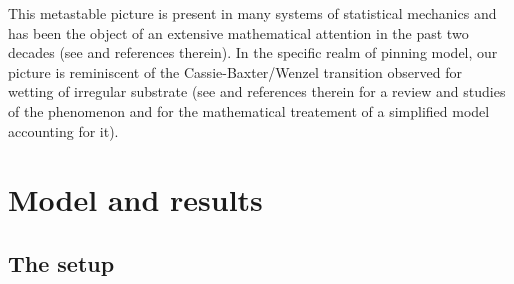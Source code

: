 \documentclass[reqno,11pt]{amsart}
\numberwithin{equation}{section}
\begin{document}
\medskip

This metastable picture is present in many systems of statistical mechanics and has been the object of an extensive mathematical attention in the past two decades (see  \cite{beltran2015martingale, bovier2016metastability} and references therein).
In the specific realm of pinning model, our picture is reminiscent of the Cassie-Baxter/Wenzel transition observed for wetting of irregular substrate (see \cite{giacomello2012} and references therein for a review and studies of the phenomenon and \cite{de2011metastable, lacoin2015mathematical} for the mathematical treatement of a simplified model accounting for it).  





\section{Model and results}\label{sec:modres}

\subsection{The setup}
\end{document}
